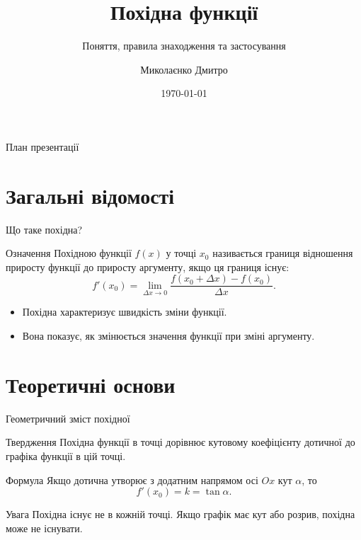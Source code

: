 \documentclass{beamer}
\title[Похідна функції]{Похідна функції}
\subtitle{Поняття, правила знаходження та застосування}
\author[Прізвище І.П.]{Миколаєнко Дмитро}
\institute[ФМФ]{Факультет математики, фізики та комп'ютерних наук}
\date{\today}
\begin{document}
\begin{frame}
    \titlepage
\end{frame}

\begin{frame}{План презентації}
    \tableofcontents
\end{frame}

\section{Загальні відомості}
\begin{frame}{Що таке похідна?}
    \begin{block}{Означення}
        Похідною функції $f(x)$ у точці $x_0$ називається границя відношення приросту функції до приросту аргументу, якщо ця границя існує:
        \[
        f'(x_0)=\lim_{\Delta x \to 0}\frac{f(x_0+\Delta x)-f(x_0)}{\Delta x}.
        \]
    \end{block}

    \begin{itemize}
        \item Похідна характеризує швидкість зміни функції.
        \item Вона показує, як змінюється значення функції при зміні аргументу.
    \end{itemize}
\end{frame}

\section{Теоретичні основи}
\begin{frame}{Геометричний зміст похідної}
    \begin{block}{Твердження}
        Похідна функції в точці дорівнює кутовому коефіцієнту дотичної до графіка функції в цій точці.
    \end{block}

    \begin{exampleblock}{Формула}
        Якщо дотична утворює з додатним напрямом осі $Ox$ кут $\alpha$, то
        \[
        f'(x_0)=k=\tan \alpha.
        \]
    \end{exampleblock}

    \begin{alertblock}{Увага}
        Похідна існує не в кожній точці. Якщо графік має кут або розрив, похідна може не існувати.
    \end{alertblock}
\end{frame}
\end{document}
